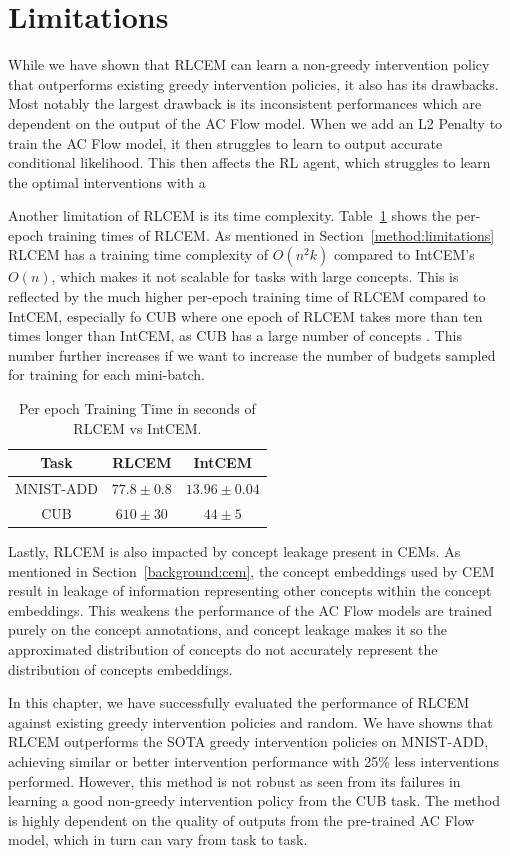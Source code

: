 \section{Limitations}\label{eval:limitations}
While we have shown that RLCEM can learn a non-greedy intervention 
policy that outperforms existing greedy intervention
policies, it also has its drawbacks. Most notably the largest
drawback is its inconsistent performances which are dependent
on the output of the AC Flow model. When we add an L2 Penalty
to train the AC Flow model, it then struggles to learn to 
output accurate conditional likelihood. This then affects the RL 
agent, which struggles to learn the optimal interventions with a 


Another limitation of RLCEM is its time complexity.
Table~\ref{table:training-times} shows the per-epoch
training times of RLCEM. As mentioned in Section~\ref{method:limitations}
RLCEM has a training time complexity of $O(n^2k)$ compared
to IntCEM's $O(n)$, which makes it not scalable for tasks
with large concepts. This is reflected by the much higher
per-epoch training time of RLCEM compared to IntCEM, especially
fo CUB where one epoch of RLCEM takes more than ten times longer
than IntCEM, as CUB has a large number of concepts
. This number further increases if we want to increase 
the number of budgets sampled for training for each mini-batch.

\begin{table}[!ht]
    \renewcommand{\arraystretch}{1.5}
    \centering
    \begin{tabular}{c|cc}
        Task & RLCEM & IntCEM \\
        \hline
        MNIST-ADD & $77.8 \pm 0.8$ & $13.96 \pm 0.04$ \\
        CUB & $610 \pm 30$ & $44 \pm 5$ 
        
    \end{tabular}
    \caption{Per epoch Training Time in seconds of RLCEM vs IntCEM.}
    \label{table:training-times}
\end{table}

Lastly, RLCEM is also impacted by concept leakage present in 
CEMs. As mentioned in Section~\ref{background:cem},
the concept embeddings used by CEM result in leakage 
of information representing other concepts within the concept embeddings.
This weakens the performance of the AC Flow models 
are trained purely on the concept annotations, and concept
leakage makes it so the approximated distribution of concepts 
do not accurately represent the distribution of concepts embeddings.

In this chapter, we have successfully evaluated the performance
of RLCEM against existing greedy intervention policies 
and random.
We have showns that RLCEM outperforms the SOTA 
greedy intervention
policies on MNIST-ADD, achieving similar or better
intervention performance with 25\% less interventions performed.
However, this method is not robust as seen from its
failures in learning a good non-greedy intervention policy from the 
CUB task. The method is highly dependent on the quality of 
outputs from the pre-trained AC Flow model, which in turn can
vary
from task to task.
